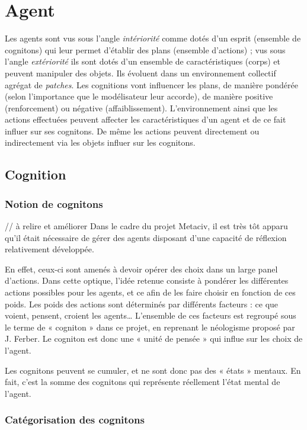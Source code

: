 \documentclass[a4paper,oneside,12 pt]{article}
\begin{document}
\section{Agent}
Les agents sont vus sous l'angle \textit{intériorité }comme dotés d'un esprit (ensemble de cognitons) qui leur permet d'établir des plans (ensemble d'actions) ;  vus sous l'angle \textit{extériorité} ils sont dotés d'un ensemble de caractéristiques (corps) et peuvent manipuler des objets. Ils évoluent dans un environnement collectif agrégat de \textit{patches}.
Les cognitions vont influencer les plans, de manière pondérée (selon l'importance que le modélisateur leur accorde), de manière positive (renforcement) ou négative (affaiblissement).
L'environnement ainsi que les actions effectuées peuvent affecter les caractéristiques d'un agent et de ce fait influer sur ses cognitons.
De même les actions peuvent directement ou indirectement via les objets influer sur les cognitons.
\subsection{Cognition}
\subsubsection{Notion de cognitons}
// à relire et améliorer
	Dans le cadre du projet Metaciv, il est très tôt apparu qu'il était nécessaire de gérer des agents disposant d'une capacité de réflexion relativement développée. 
	
	En effet, ceux-ci sont amenés à devoir opérer des choix dans un large panel d'actions.
	Dans cette optique, l'idée retenue consiste à pondérer les différentes actions possibles pour les agents, et  ce afin de les faire choisir en fonction de ces poids. 
	Les poids des actions sont déterminés par différents facteurs : ce que voient, pensent, croient les agents… L'ensemble de ces facteurs est regroupé sous le terme de « cogniton » dans ce projet, en reprenant le néologisme proposé par J. Ferber. Le cogniton est donc une « unité de pensée » qui influe sur les choix de l'agent. 	
	
	Les cognitons peuvent se cumuler, et ne sont donc pas des « états » mentaux. En fait, c'est la somme des cognitons qui représente réellement l'état mental de l'agent.
	
\subsubsection{Catégorisation des cognitons}
\end{document}
